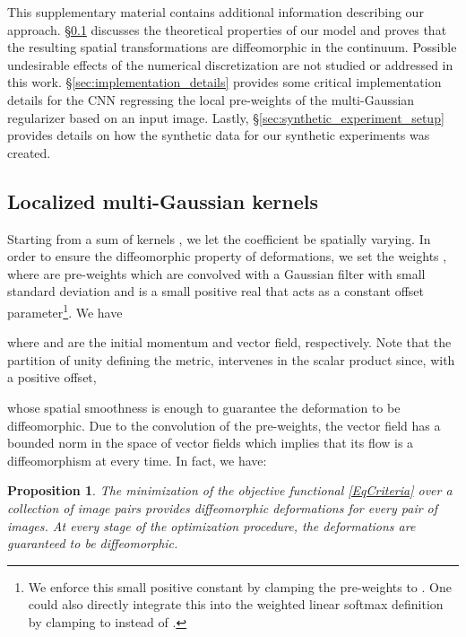 \documentclass[10pt,twocolumn,letterpaper,table]{article}
\numberwithin{equation}{section}
\theoremstyle{plain}
\newtheorem{proposition}[theorem]{Proposition}
\theoremstyle{definition}
\begin{document}
This supplementary material contains additional information describing our approach. \S\ref{sec:sqrt_model} discusses the theoretical properties of our model and proves that the resulting spatial transformations are diffeomorphic in the continuum. Possible undesirable effects of the numerical discretization are not studied or addressed in this work. \S\ref{sec:implementation_details} provides some critical implementation details for the CNN regressing the local pre-weights of the multi-Gaussian regularizer based on an input image. Lastly, \S\ref{sec:synthetic_experiment_setup} provides details on how the synthetic data for our synthetic experiments was created.

\subsection{Localized multi-Gaussian kernels}
\label{sec:sqrt_model}

Starting from a sum of kernels 
, we let the coefficient  be spatially varying. In order to ensure the diffeomorphic property of deformations, we set the weights , where  are pre-weights which are convolved with a Gaussian filter with small standard deviation and  is a small positive real that acts as a constant offset parameter\footnote{We enforce this small positive constant by clamping the pre-weights to . One could also directly integrate this into the weighted linear softmax definition by clamping to  instead of .}. We have

where  and  are the initial momentum and vector field, respectively. Note that the partition of unity defining the metric, intervenes in the  scalar product  since, with  a positive offset,

whose spatial smoothness is enough to guarantee the deformation to be diffeomorphic.
Due to the convolution of the pre-weights, the vector field  has a bounded norm in the space of  vector fields which implies that its flow is a diffeomorphism at every time.
In fact, we have:
\begin{proposition}
The minimization of the objective functional \eqref{EqCriteria} over a collection of image pairs provides diffeomorphic deformations for every pair of images. At every stage of the optimization procedure, the deformations are guaranteed to be diffeomorphic.
\end{proposition}
\end{document}
